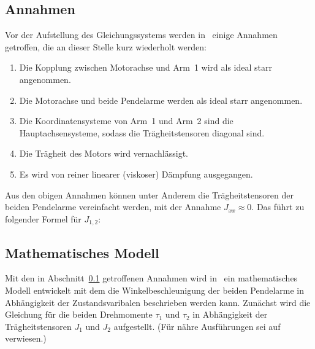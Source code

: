 \subsection{Annahmen}
\label{sub.sub.Annahmen}
Vor der Aufstellung des Gleichungssystems werden in~\cite{Cazzolato.2011} einige Annahmen getroffen, die an dieser Stelle kurz wiederholt werden:
\begin{enumerate}
\item Die Kopplung zwischen Motorachse und Arm~1 wird als ideal starr angenommen.
\item Die Motorachse und beide Pendelarme werden als ideal starr angenommen.
\item Die Koordinatensysteme von Arm~1 und Arm~2 sind die Hauptachsensysteme, sodass die Trägheitstensoren diagonal sind.
\item Die Trägheit des Motors wird vernachlässigt. %
\item Es wird von reiner linearer (viskoser) Dämpfung ausgegangen.
\end{enumerate}

Aus den obigen Annahmen können unter Anderem die Trägheitstensoren der beiden Pendelarme vereinfacht werden, mit der Annahme $J_{xx} \approx 0$. 
Das führt zu folgender Formel für $J_{1,2}$:


\subsection{Mathematisches Modell}
\label{sub.sub.Mathematisches-Modell}
Mit den in Abschnitt~\ref{sub.sub.Annahmen} getroffenen Annahmen wird in~\cite{Cazzolato.2011} ein mathematisches Modell entwickelt mit dem die Winkelbeschleunigung der beiden Pendelarme in Abhängigkeit der Zustands\-varibalen beschrieben werden kann. 
Zunächst wird die Gleichung für die beiden Drehmomente $\tau_1$ und $\tau_2$ in Abhängigkeit der Trägheitstensoren $J_1$ und $J_2$ aufgestellt.
(Für nähre Ausführungen sei auf~\cite{Cazzolato.2011} verwiesen.)

